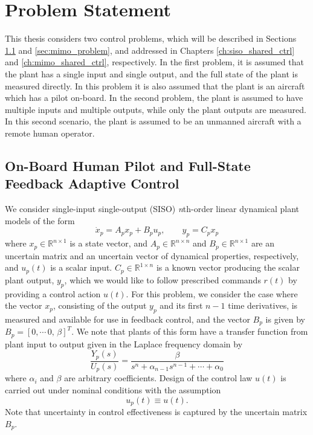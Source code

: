 \chapter{Problem Statement} \label{ch:problem}

This thesis considers two control problems, which will be described in Sections \ref{sec:siso_problem} and \ref{sec:mimo_problem}, and addressed in Chapters \ref{ch:siso_shared_ctrl} and \ref{ch:mimo_shared_ctrl}, respectively. In the first problem, it is assumed that the plant has a single input and single output, and the full state of the plant is measured directly. In this problem it is also assumed that the plant is an aircraft which has a pilot on-board. In the second problem, the plant is assumed to have multiple inputs and multiple outputs, while only the plant outputs are measured. In this second scenario, the plant is assumed to be an unmanned aircraft with a remote human operator.

\section{On-Board Human Pilot and Full-State Feedback Adaptive Control} \label{sec:siso_problem}

We consider single-input single-output (SISO) \textit{n}th-order linear dynamical plant models of the form 
\begin{equation}
\dot x_p = A_p x_p + B_p u_p	, \qquad y_p = C_p x_p \label{eq:siso_plant}
\end{equation} 
\noindent where $x_p \in \mathbb{R}^{n \times 1}$ is a state vector, and $A_p \in \mathbb{R}^{n \times n}$ and $B_p \in \mathbb{R}^{n \times 1}$ are an uncertain matrix and an uncertain vector of dynamical properties, respectively, and $u_p(t)$ is a scalar input. $C_p \in \mathbb{R}^{1 \times n}$ is a known vector producing the scalar plant output, $y_p$, which we would like to follow prescribed commands $r(t)$ by providing a control action $u(t)$. For this problem, we consider the case where the vector $x_p$, consisting of the output $y_p$ and its first $n-1$ time derivatives, is measured and available for use in feedback control, and the vector $B_p$ is given by $B_p = [0, \cdots \, 0, \, \beta]^T$. We note that plants of this form have a transfer function from plant input to output given in the Laplace frequency domain by
\begin{equation}
\frac{Y_p(s)}{U_p(s)} = \frac{\beta}{s^n + \alpha_{n-1} s^{n-1} + \cdots + \alpha_0}	
\end{equation}
where $\alpha_i$ and $\beta$ are arbitrary coefficients. Design of the control law $u(t)$ is carried out under nominal conditions with the assumption
\begin{equation}
	u_p(t) \equiv u(t). \label{eq:siso_plant_input_nom}
\end{equation} %
Note that uncertainty in control effectiveness is captured by the uncertain matrix $B_p$. 

